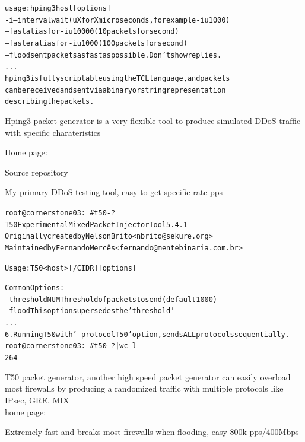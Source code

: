 \documentclass[20pt,landscape,a4paper,footrule]{foils}
\begin{document}

\begin{alltt}\footnotesize
usage: hping3 host [options]
  -i  --interval  wait (uX for X microseconds, for example -i u1000)
      --fast      alias for -i u10000 (10 packets for second)
      --faster    alias for -i u1000 (100 packets for second)
      --flood	   sent packets as fast as possible. Don't show replies.
...
hping3 is fully scriptable using the TCL language, and packets
can be received and sent via a binary or string representation
describing the packets.
\end{alltt}

\begin{list2}
\item Hping3 packet generator is a very flexible tool to produce simulated DDoS traffic with specific charateristics
\item Home page: 
\item Source repository 
\end{list2}

\centerline{My primary DDoS testing tool, easy to get specific rate pps}




\begin{alltt}\footnotesize
root@cornerstone03:~# t50 -?
T50 Experimental Mixed Packet Injector Tool 5.4.1
Originally created by Nelson Brito <nbrito@sekure.org>
Maintained by Fernando Mercês <fernando@mentebinaria.com.br>

Usage: T50 <host> [/CIDR] [options]

Common Options:
    --threshold NUM        Threshold of packets to send     (default 1000)
    --flood                This option supersedes the 'threshold'
...
6. Running T50 with '--protocol T50' option, sends ALL protocols sequentially.
root@cornerstone03:~# t50 -? | wc -l
264
\end{alltt}

\begin{list2}
\item T50 packet generator, another high speed packet generator
can easily overload most firewalls by producing a randomized traffic with multiple protocols like IPsec, GRE, MIX \\
home page: 
\end{list2}

\centerline{Extremely fast and breaks most firewalls when flooding, easy 800k pps/400Mbps}
\end{document}
